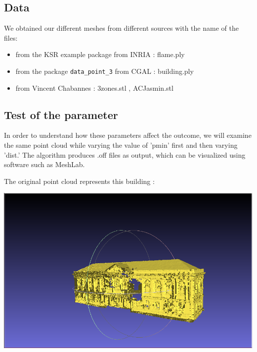 \documentclass{article}
\begin{document}
\subsection{Data}
We obtained our different meshes from different sources with the name of the files: 
\begin{itemize}
  \item from the KSR example package from INRIA : flame.ply
  \item from the package \texttt{data\_point\_3} from CGAL : building.ply 
  \item from Vincent Chabannes : 3zones.stl , ACJasmin.stl
\end{itemize}

\subsection{Test of the parameter}
In order to understand how these parameters affect the outcome, we will examine the same point cloud while varying the value of 'pmin' first and then varying 'dist.'
The algorithm produces .off files as output, which can be visualized using software such as MeshLab.

\newpage
The original point cloud represents this building :
\vspace{\baselineskip}

\begin{center}
    \includegraphics[scale=0.20]{../../images/screen_kinetic/building.png} 
\end{center}
\end{document}
